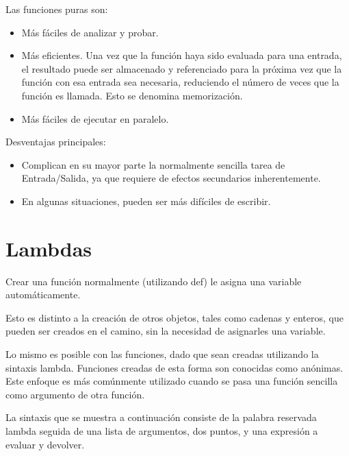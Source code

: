 \documentclass{report}
\begin{document}
Las funciones puras son:

\begin{itemize}
  \item Más fáciles de analizar y probar.
  
  \item Más eficientes. Una vez que la función haya sido evaluada para una entrada, el resultado puede ser almacenado y referenciado para la próxima vez que la función con esa entrada sea necesaria, reduciendo el número de veces que la función es llamada. Esto se denomina memorización.
  
  \item Más fáciles de ejecutar en paralelo.
  
\end{itemize}

Desventajas principales:

\begin{itemize}
  \item Complican en su mayor parte la normalmente sencilla tarea de Entrada/Salida, ya que requiere de efectos secundarios inherentemente.
  
  \item En algunas situaciones, pueden ser más difíciles de escribir.
  
\end{itemize}

\section{Lambdas}

Crear una función normalmente (utilizando def) le asigna una variable automáticamente.\smallskip

Esto es distinto a la creación de otros objetos, tales como cadenas y enteros, que pueden ser creados en el camino, sin la necesidad de asignarles una variable.\smallskip

Lo mismo es posible con las funciones, dado que sean creadas utilizando la sintaxis lambda. Funciones creadas de esta forma son conocidas como anónimas.
Este enfoque es más comúnmente utilizado cuando se pasa una función sencilla como argumento de otra función.\smallskip

La sintaxis que se muestra a continuación consiste de la palabra reservada lambda seguida de una lista de argumentos, dos puntos, y una expresión a evaluar y devolver.

\end{document}
